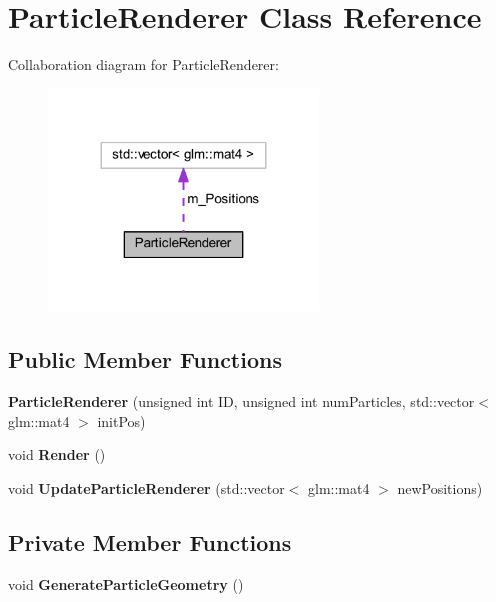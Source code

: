 \hypertarget{class_particle_renderer}{}\section{Particle\+Renderer Class Reference}
\label{class_particle_renderer}


Collaboration diagram for Particle\+Renderer\+:
\nopagebreak
\begin{figure}[H]
\begin{center}
\leavevmode
\includegraphics[width=203pt]{class_particle_renderer__coll__graph}
\end{center}
\end{figure}
\subsection*{Public Member Functions}
\begin{DoxyCompactItemize}
\item 
{\bfseries Particle\+Renderer} (unsigned int ID, unsigned int num\+Particles, std\+::vector$<$ glm\+::mat4 $>$ init\+Pos)\hypertarget{class_particle_renderer_a36881e94f634b7ec31f8eba39d28567d}{}\label{class_particle_renderer_a36881e94f634b7ec31f8eba39d28567d}

\item 
void {\bfseries Render} ()\hypertarget{class_particle_renderer_aaec6cf2ac4e0a0a433c6bd35d2bc7371}{}\label{class_particle_renderer_aaec6cf2ac4e0a0a433c6bd35d2bc7371}

\item 
void {\bfseries Update\+Particle\+Renderer} (std\+::vector$<$ glm\+::mat4 $>$ new\+Positions)\hypertarget{class_particle_renderer_ad755ee803455a6207477b5e37e6cf04e}{}\label{class_particle_renderer_ad755ee803455a6207477b5e37e6cf04e}

\end{DoxyCompactItemize}
\subsection*{Private Member Functions}
\begin{DoxyCompactItemize}
\item 
void {\bfseries Generate\+Particle\+Geometry} ()\hypertarget{class_particle_renderer_aff0b801a18319ef1ffa0aabde62ddac2}{}\label{class_particle_renderer_aff0b801a18319ef1ffa0aabde62ddac2}

\end{DoxyCompactItemize}

